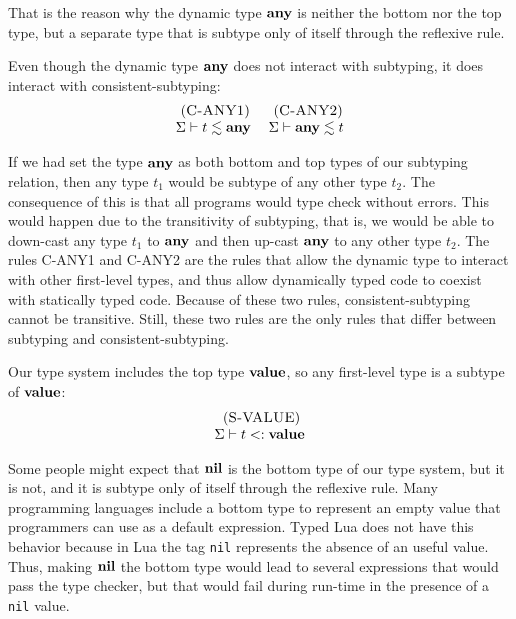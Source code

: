That is the reason why the dynamic type $\mathbf{any}$ is neither the bottom nor the top type,
but a separate type that is subtype only of itself through the reflexive rule.

Even though the dynamic type $\mathbf{any}$ does not interact with subtyping,
it does interact with consistent-subtyping:
\[
\begin{array}{c}
\begin{array}{c}
\; (\textsc{C-ANY1})\\
\Sigma \vdash t \lesssim \mathbf{any}
\end{array}
\;
\begin{array}{c}
\; (\textsc{C-ANY2})\\
\Sigma \vdash \mathbf{any} \lesssim t
\end{array}
\end{array}
\]

If we had set the type $\mathbf{any}$ as both bottom and top types of our
subtyping relation, then any type $t_{1}$ would be subtype of
any other type $t_{2}$.
The consequence of this is that all programs would type check without errors.
This would happen due to the transitivity of subtyping, that is,
we would be able to down-cast any type $t_{1}$ to $\mathbf{any}$ and then up-cast
$\mathbf{any}$ to any other type $t_{2}$.
The rules \textsc{C-ANY1} and \textsc{C-ANY2} are the rules that
allow the dynamic type to interact with other first-level types,
and thus allow dynamically typed code to coexist with statically
typed code.
Because of these two rules, consistent-subtyping cannot be transitive.
Still, these two rules are the only rules that differ between
subtyping and consistent-subtyping.

Our type system includes the top type $\mathbf{value}$,
so any first-level type is a subtype of $\mathbf{value}$:
\[
\begin{array}{c}
\; (\textsc{S-VALUE})\\
\Sigma \vdash t <: \mathbf{value}
\end{array}
\]

Some people might expect that $\mathbf{nil}$ is the bottom type
of our type system, but it is not,
and it is subtype only of itself through the reflexive rule.
Many programming languages include a bottom type to represent
an empty value that programmers can use as a default expression.
Typed Lua does not have this behavior because in Lua the tag \texttt{nil}
represents the absence of an useful value.
Thus, making $\mathbf{nil}$ the bottom type would lead to several expressions
that would pass the type checker, but that would fail during run-time
in the presence of a \texttt{nil} value.

